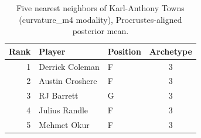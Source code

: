 \begin{table}[htbp]
  \centering\small
  \begin{tabular}{rllc}
    \toprule
    Rank & Player & Position & Archetype \\
    \midrule
    1 & Derrick Coleman & F & 3 \\
    2 & Austin Croshere & F & 3 \\
    3 & RJ Barrett & G & 3 \\
    4 & Julius Randle & F & 3 \\
    5 & Mehmet Okur & F & 3 \\
    \bottomrule
  \end{tabular}
  \caption{Five nearest neighbors of Karl-Anthony Towns (curvature_m4 modality), Procrustes-aligned posterior mean.}
  \label{tab:Karl_Anthony_Towns_neighbors_curvature_m4}
\end{table}

